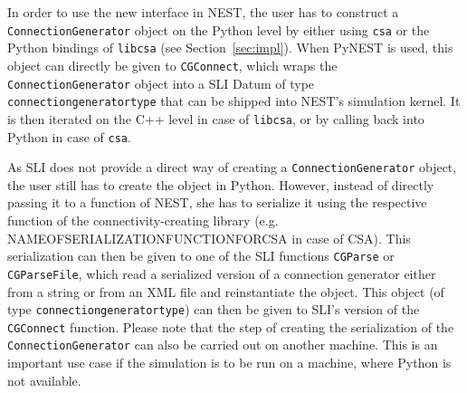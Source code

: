 \documentclass{frontiersSCNS} %
\begin{document}
In order to use the new interface in NEST, the user has to construct a
\verb|ConnectionGenerator| object on the Python level by either using
\verb|csa| or the Python bindings of \verb|libcsa| (see
Section~\ref{sec:impl}). When PyNEST is used, this object can directly
be given to \verb|CGConnect|, which wraps the
\verb|ConnectionGenerator| object into a SLI Datum of type
\verb|connectiongeneratortype| that can be shipped into NEST's
simulation kernel. It is then iterated on the C++ level in case of
\verb|libcsa|, or by calling back into Python in case of \verb|csa|.

As SLI does not provide a direct way of creating a
\verb|ConnectionGenerator| object, the user still has to create the
object in Python. However, instead of directly passing it to a
function of NEST, she has to serialize it using the respective
function of the connectivity-creating library
(e.g. NAMEOFSERIALIZATIONFUNCTIONFORCSA in case of CSA). This
serialization can then be given to one of the SLI functions
\verb|CGParse| or \verb|CGParseFile|, which read a serialized version
of a connection generator either from a string or from an XML file and
reinstantiate the object. This object (of type
\verb|connectiongeneratortype|) can then be given to SLI's version of
the \verb|CGConnect| function. Please note that the step of creating
the serialization of the \verb|ConnectionGenerator| can also be
carried out on another machine. This is an important use case if the
simulation is to be run on a machine, where Python is not available.
\end{document}
